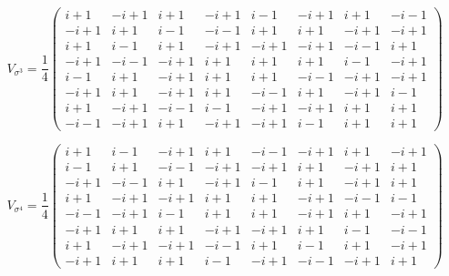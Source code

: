 \documentclass[a4paper]{article}
\begin{document}
  \begin{equation}
    V_{\sigma^3} = \frac{1}{4}
    \displaystyle \left(\begin{array}{rrrrrrrr}
i + 1 & -i + 1 & i + 1 & -i + 1 & i - 1 & -i + 1 & i + 1 & -i - 1 \\
-i + 1 & i + 1 & i - 1 & -i - 1 & i + 1 & i + 1 & -i + 1 & -i + 1 \\
i + 1 & i - 1 & i + 1 & -i + 1 & -i + 1 & -i + 1 & -i - 1 & i + 1 \\
-i + 1 & -i - 1 & -i + 1 & i + 1 & i + 1 & i + 1 & i - 1 & -i + 1 \\
i - 1 & i + 1 & -i + 1 & i + 1 & i + 1 & -i - 1 & -i + 1 & -i + 1 \\
-i + 1 & i + 1 & -i + 1 & i + 1 & -i - 1 & i + 1 & -i + 1 & i - 1 \\
i + 1 & -i + 1 & -i - 1 & i - 1 & -i + 1 & -i + 1 & i + 1 & i + 1 \\
-i - 1 & -i + 1 & i + 1 & -i + 1 & -i + 1 & i - 1 & i + 1 & i + 1
\end{array}\right)
  \end{equation}

  \begin{equation}
    V_{\sigma^4} = \frac{1}{4}
    \displaystyle \left(\begin{array}{rrrrrrrr}
i + 1 & i - 1 & -i + 1 & i + 1 & -i - 1 & -i + 1 & i + 1 & -i + 1 \\
i - 1 & i + 1 & -i - 1 & -i + 1 & -i + 1 & i + 1 & -i + 1 & i + 1 \\
-i + 1 & -i - 1 & i + 1 & -i + 1 & i - 1 & i + 1 & -i + 1 & i + 1 \\
i + 1 & -i + 1 & -i + 1 & i + 1 & i + 1 & -i + 1 & -i - 1 & i - 1 \\
-i - 1 & -i + 1 & i - 1 & i + 1 & i + 1 & -i + 1 & i + 1 & -i + 1 \\
-i + 1 & i + 1 & i + 1 & -i + 1 & -i + 1 & i + 1 & i - 1 & -i - 1 \\
i + 1 & -i + 1 & -i + 1 & -i - 1 & i + 1 & i - 1 & i + 1 & -i + 1 \\
-i + 1 & i + 1 & i + 1 & i - 1 & -i + 1 & -i - 1 & -i + 1 & i + 1
\end{array}\right)
  \end{equation}
\end{document}
